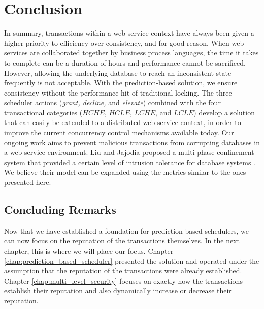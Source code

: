 \section{Conclusion}
\label{pbs:conclusion}
In summary, transactions within a web service context have always been given a higher priority to efficiency over consistency, and for good reason. When web services are collaborated together by business process languages, the time it takes to complete can be a duration of hours and performance cannot be sacrificed. However, allowing the underlying database to reach an inconsistent state frequently is not acceptable. With the prediction-based solution, we ensure consistency without the performance hit of traditional locking. The three scheduler actions (\textit{grant, decline,} and \textit{elevate}) combined with the four transactional categories ($HCHE$, $HCLE$, $LCHE$, and $LCLE$) develop a solution that can easily be extended to a distributed web service context, in order to improve the current concurrency control mechanisms available today. Our ongoing work aims to prevent malicious transactions from corrupting databases in a web service environment. Liu and Jajodia proposed a multi-phase confinement system that provided a certain level of intrusion tolerance for database systems \cite{Liu_Intrusion}. We believe their model can be expanded using the metrics similar to the ones presented here.

\subsection{Concluding Remarks}
Now that we have established a foundation for prediction-based schedulers, we can now focus on the reputation of the transactions themselves. In the next chapter, this is where we will place our focus. Chapter \ref{chap:prediction_based_scheduler} presented the solution and operated under the assumption that the reputation of the transactions were already established. Chapter \ref{chap:multi_level_security} focuses on exactly how the transactions establish their reputation and also dynamically increase or decrease their reputation.

